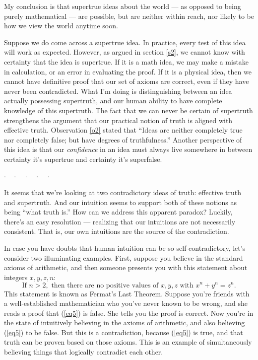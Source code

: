 \documentclass[9pt, twoside]{book}
\theoremstyle{argtstyle}
\newcommand{\dotq}{\cdot\quad}
\newcommand{\scenebreak}{
    \medskip\centerline{$\dotq\dotq\dotq\dotq\cdot$}\medskip
}
\begin{document}
My conclusion is
that supertrue ideas about the world --- as opposed to being purely
mathematical --- are possible, but are neither within reach,
nor likely to be how we view the world anytime soon.

Suppose we do come across a supertrue idea. In practice, every test of this idea
will work as expected.
However, as argued in section \ref{s2}, we cannot know with certainty that
the idea is supertrue. If it is a math idea, we may make a mistake in
calculation, or an error in evaluating the proof. If it is a physical idea, then
we cannot have definitive proof that our set of axioms are correct, even if they
have never been contradicted. What I'm doing is distinguishing between an idea
actually possessing supertruth, and our human ability to have complete knowledge
of this supertruth. The fact that we can never be certain of supertruth
strengthens the argument that our practical notion of truth is aligned with
effective truth. Observation \ref{o2} stated that ``Ideas
are neither completely true nor completely false; but have degrees
of truthfulness.''
Another perspective of this idea is that our {\em confidence} in
an idea must always live somewhere in between certainty it's supertrue
and certainty it's superfalse.

\scenebreak

It seems that we're looking at two contradictory ideas of truth: effective
truth and supertruth. And our intuition seems to support both of these notions
as being ``what truth is.'' How can we address this apparent paradox?
Luckily, there's an easy resolution --- realizing that our intuitions are not
necessarily consistent. That is, our own intuitions are the source of the
contradiction.

In case you have doubts that human intuition can be so self-contradictory, let's
consider two illuminating examples. First, suppose you believe in the standard
axioms of arithmetic, and then someone presents you with this statement about
integers $x,y,z,n$:
\begin{equation}\label{eq5}
    \text{If } n>2, \text{ then there are no positive values of }
    x, y, z \text{ with } x^n+y^n=z^n.
\end{equation}
This statement is known as Fermat's Last Theorem.
Suppose you're friends with a well-established mathematician who you've never
known to be wrong, and she reads a proof that (\ref{eq5}) is false.
She tells you
the proof is correct.
Now you're in the state of intuitively believing in the axioms of arithmetic,
and also believing (\ref{eq5}) to be false.
But this is a contradiction, because
(\ref{eq5}) is true, and that truth can be proven based on those axioms. This is
an example of simultaneously believing things that logically contradict each
other.
\end{document}
